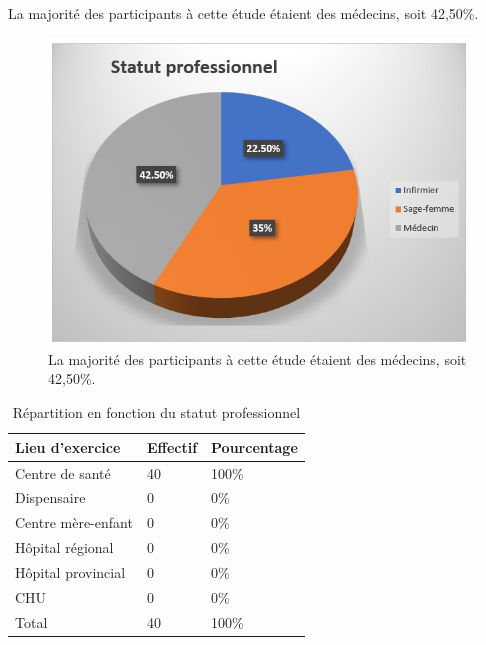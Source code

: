 \noindent La majorité des participants à cette étude étaient des médecins, soit 42,50\%.  

\begin{figure}[H]
  \centering
  \includegraphics{Images/fig_45.jpg}
  \caption{La majorité des participants à cette étude étaient des médecins, soit 42,50\%. }
  
\end{figure}

\begin{table}[H]
  \centering
  \renewcommand{\arraystretch}{1.5}
  \caption{Répartition en fonction du statut professionnel}
  \begin{spacing}{1.5} %
  \begin{tabularx}{\textwidth}{|X|X|X|}
      \hline
      \rowcolor{customcolor!90}
      \textbf{\color{white}Lieu d’exercice} & \textbf{\color{white}Effectif} & \textbf{\color{white}Pourcentage}  \\
      \hline
      Centre de santé & 40  & 100\% \\
      \hline
      Dispensaire & 0 & 0\% \\
      \hline
      Centre mère-enfant & 0 & 0\% \\
      \hline
      Hôpital régional & 0 & 0\% \\
      \hline
      Hôpital provincial & 0 & 0\% \\
      \hline
      CHU & 0 & 0\% \\
     \hline
      Total & 40 & 100\% \\
      \hline
  \end{tabularx}
\end{spacing}

\end{table}

